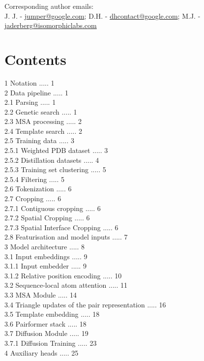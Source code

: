 \documentclass[10pt]{article}
\begin{document}
Corresponding author emails:\\
J. J. - \href{mailto:jumper@google.com}{jumper@google.com}; D.H. - \href{mailto:dhcontact@google.com}{dhcontact@google.com}; M.J. - \href{mailto:jaderberg@isomorphiclabs.com}{jaderberg@isomorphiclabs.com}

\section*{Contents}
1 Notation ..... 1\\
2 Data pipeline ..... 1\\
2.1 Parsing ..... 1\\
2.2 Genetic search ..... 1\\
2.3 MSA processing ..... 2\\
2.4 Template search ..... 2\\
2.5 Training data ..... 3\\
2.5.1 Weighted PDB dataset ..... 3\\
2.5.2 Distillation datasets ..... 4\\
2.5.3 Training set clustering ..... 5\\
2.5.4 Filtering ..... 5\\
2.6 Tokenization ..... 6\\
2.7 Cropping ..... 6\\
2.7.1 Contiguous cropping ..... 6\\
2.7.2 Spatial Cropping ..... 6\\
2.7.3 Spatial Interface Cropping ..... 6\\
2.8 Featurisation and model inputs ..... 7\\
3 Model architecture ..... 8\\
3.1 Input embeddings ..... 9\\
3.1.1 Input embedder ..... 9\\
3.1.2 Relative position encoding ..... 10\\
3.2 Sequence-local atom attention ..... 11\\
3.3 MSA Module ..... 14\\
3.4 Triangle updates of the pair representation ..... 16\\
3.5 Template embedding ..... 18\\
3.6 Pairformer stack ..... 18\\
3.7 Diffusion Module ..... 19\\
3.7.1 Diffusion Training ..... 23\\
4 Auxiliary heads ..... 25\\
\end{document}
